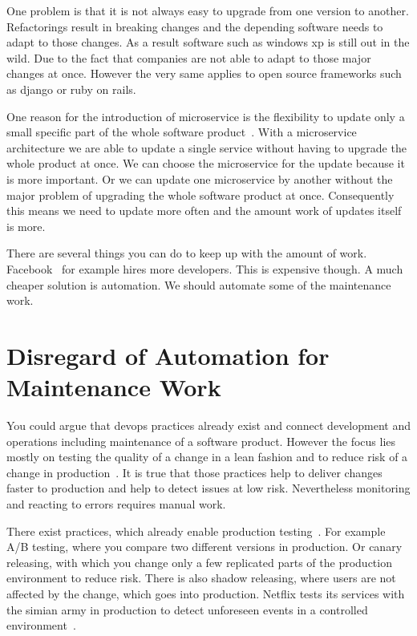 One problem is that it is not always easy to upgrade from one version to
another. Refactorings result in breaking changes and the depending software needs to adapt
to those changes. As a result software such as windows xp is still out in the wild. Due to
the fact that companies are not able to adapt to those major changes at once. However the
very same applies to open source frameworks such as django or ruby on rails.

One reason for the introduction of microservice is the flexibility to update only a small
specific part of the whole software product~\cite{microservices_fowler}. With a
microservice architecture we are able to update a single service without having to upgrade
the whole product at once. We can choose the microservice for the update because it is
more important. Or we can update one microservice by another without the major problem of
upgrading the whole software product at once. Consequently this means we need to update
more often and the amount work of updates itself is more.

There are several things you can do to keep up with the amount of
work. Facebook~\cite{dev_at_fb} for example hires more developers. This is expensive
though. A much cheaper solution is automation. We should automate some of the maintenance
work.

\section{Disregard of Automation for Maintenance Work}

You could argue that devops practices already exist and connect development and operations
including maintenance of a software product. However the focus lies mostly on testing the
quality of a change in a lean fashion and to reduce risk of a change in
production~\cite{devops_definition}. It is true that those practices help to deliver
changes faster to production and help to detect issues at low risk. Nevertheless
monitoring and reacting to errors requires manual work.

There exist practices, which already enable production testing~\cite{dev_at_fb}. For
example A/B testing, where you compare two different versions in production. Or canary
releasing, with which you change only a few replicated parts of the production environment
to reduce risk. There is also shadow releasing, where users are not affected by the
change, which goes into production. Netflix tests its services with the simian army in
production to detect unforeseen events in a controlled environment~\cite{antifragile_org}.

